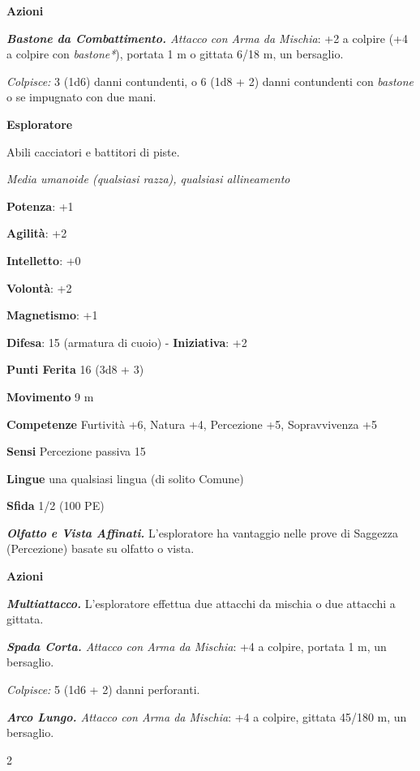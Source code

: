 \begin{multicols}{2}
\smallskip\textbf{Azioni}

\emph{\textbf{Bastone da Combattimento.} Attacco con Arma da Mischia}:
+2 a colpire (+4 a colpire con \emph{bastone*}), portata 1 m o gittata
6/18 m, un bersaglio.

\emph{Colpisce:} 3 (1d6) danni contundenti, o 6 (1d8 + 2) danni
contundenti con \emph{bastone} o se impugnato con due mani.

\textbf{Esploratore}

Abili cacciatori e battitori di piste.

\emph{Media umanoide (qualsiasi razza), qualsiasi allineamento}

\textbf{Potenza}: +1

\textbf{Agilità}: +2

\textbf{Intelletto}: +0

\textbf{Volontà}: +2

\textbf{Magnetismo}: +1

\textbf{Difesa}: 15 (armatura di cuoio) - \textbf{Iniziativa}: +2

\textbf{Punti Ferita} 16 (3d8 + 3)

\textbf{Movimento} 9 m

\textbf{Competenze} Furtività +6, Natura +4, Percezione +5, Sopravvivenza +5

\textbf{Sensi} Percezione passiva 15

\textbf{Lingue} una qualsiasi lingua (di solito Comune)

\textbf{Sfida} 1/2 (100 PE)\smallskip

\emph{\textbf{Olfatto e Vista Affinati.}} L'esploratore ha vantaggio
nelle prove di Saggezza (Percezione) basate su olfatto o vista.

\smallskip\textbf{Azioni}

\emph{\textbf{Multiattacco.}} L'esploratore effettua due attacchi da
mischia o due attacchi a gittata.

\emph{\textbf{Spada Corta.} Attacco con Arma da Mischia}: +4 a colpire,
portata 1 m, un bersaglio.

\emph{Colpisce:} 5 (1d6 + 2) danni perforanti.

\emph{\textbf{Arco Lungo.} Attacco con Arma da Mischia}: +4 a colpire,
gittata 45/180 m, un bersaglio.

\end{multicols}{2}
